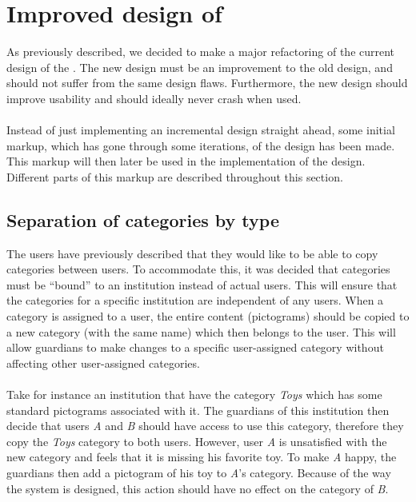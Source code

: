 \section{Improved design of \ct}
\label{sec:improved_design}

As previously described, we decided to make a major refactoring of the current design of the \ct. The new design must be an improvement to the old design, and should not suffer from the same design flaws. Furthermore, the new design should improve usability and should ideally never crash when used.
\\\\
Instead of just implementing an incremental design straight ahead, some initial markup, which has gone through some iterations, of the design has been made. This markup will then later be used in the implementation of the design. Different parts of this markup are described throughout this section.

\subsection{Separation of categories by type}
The users have previously described that they would like to be able to copy categories between users. To accommodate this, it was decided that categories must  be ``bound'' to an institution instead of actual users. This will ensure that the categories for a specific institution are independent of any users. When a category is assigned to a user, the entire content (pictograms) should be copied to a new category (with the same name) which then belongs to the user. This will allow guardians to make changes to a specific user-assigned category without affecting other user-assigned categories. 
\\\\
Take for instance an institution that have the category \emph{Toys} which has some standard pictograms associated with it. The guardians of this institution then decide that users \emph{A} and \emph{B} should have access to use this category, therefore they copy the \emph{Toys} category to both users. However, user \emph{A} is unsatisfied with the new category and feels that it is missing his favorite toy. To make \emph{A} happy, the guardians then add a pictogram of his toy to \emph{A}'s category. Because of the way the system is designed, this action should have no effect on the category of \emph{B}. \\

